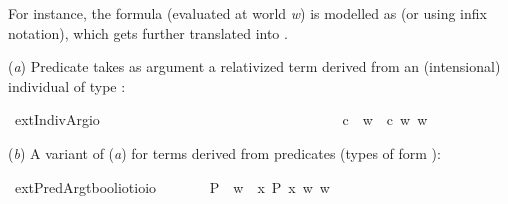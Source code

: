 \begin{isabellebody}
\begin{isamarkuptext}
For instance, the formula  (evaluated at world \emph{w}) is modelled as 
(or  using infix notation), which gets further translated into .%
\end{isamarkuptext}\isamarkuptrue%
%
\begin{isamarkuptext}%
(\emph{a}) Predicate \isa{{\isasymphi}} takes as argument a relativized term derived from an (intensional) individual of type \isa{{\isasymup}{\isasymzero}}:%
\end{isamarkuptext}\isamarkuptrue%
\isamarkupfalse%
\ extIndivArg{\isacharcolon}{\isacharcolon}{\isachardoublequoteopen}{\isasymup}{\isasymlangle}{\isasymzero}{\isasymrangle}{\isasymRightarrow}{\isasymup}{\isasymzero}{\isasymRightarrow}io{\isachardoublequoteclose}\ {\isacharparenleft}\ {\isachardoublequoteopen}{\isasymdownharpoonleft}{\isachardoublequoteclose}\ {}{}{\isacharparenright}\ \ \ \ \ \ \ \ \ \ \ \ \ \ \ \ \ \ \ \ \ \ \ \ \ \ \ \isanewline
\ \ \ {\isachardoublequoteopen}{\isasymphi}\ {\isasymdownharpoonleft}c\ {\isasymequiv}\ {\isasymlambda}w{\isachardot}\ {\isasymphi}\ {\isacharparenleft}c\ w{\isacharparenright}\ w{\isachardoublequoteclose}%
\begin{isamarkuptext}%
(\emph{b}) A variant of (\emph{a}) for terms derived from predicates (types of form ):%
\end{isamarkuptext}\isamarkuptrue%
\isamarkupfalse%
\ extPredArg{\isacharcolon}{\isacharcolon}{\isachardoublequoteopen}{\isacharparenleft}{\isacharparenleft}{\isacharprime}t{\isasymRightarrow}bool{\isacharparenright}{\isasymRightarrow}io{\isacharparenright}{\isasymRightarrow}{\isacharparenleft}{\isacharprime}t{\isasymRightarrow}io{\isacharparenright}{\isasymRightarrow}io{\isachardoublequoteclose}\ {\isacharparenleft}\ {\isachardoublequoteopen}{\isasymdown}{\isachardoublequoteclose}\ {}{}{\isacharparenright}\isanewline
\ \ \ {\isachardoublequoteopen}{\isasymphi}\ {\isasymdown}P\ {\isasymequiv}\ {\isasymlambda}w{\isachardot}\ {\isasymphi}\ {\isacharparenleft}{\isasymlambda}x{\isachardot}\ P\ x\ w{\isacharparenright}\ w{\isachardoublequoteclose}%

\end{isabellebody}
